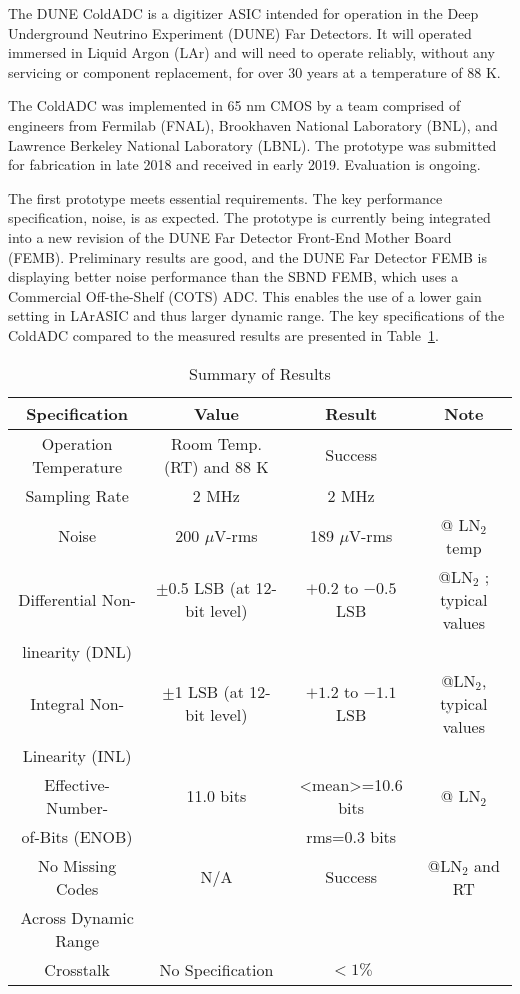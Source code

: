 \label{sec:1}

The DUNE ColdADC is a digitizer ASIC intended for operation in the Deep Underground Neutrino Experiment (DUNE) Far Detectors. It will operated immersed in Liquid Argon (LAr) and will need to operate reliably, without any servicing or component replacement, for over 30 years at a temperature of 88 K.

The ColdADC was implemented in 65 nm CMOS by a team comprised of engineers from Fermilab (FNAL), Brookhaven National Laboratory (BNL), and Lawrence Berkeley National Laboratory (LBNL). The prototype was submitted for fabrication in late 2018 and received in early 2019. Evaluation is ongoing. 

The first prototype meets essential requirements. The key performance specification, noise, is as expected. The prototype is currently being integrated into a new revision of the DUNE Far Detector Front-End Mother Board (FEMB). Preliminary results are good, and the DUNE Far Detector FEMB is displaying better noise performance than the SBND FEMB, which uses a Commercial Off-the-Shelf (COTS) ADC. This enables the use of a lower gain setting in LArASIC and thus larger dynamic range. The key specifications of the ColdADC compared to the measured results are presented in Table~\ref{tab:coldadc_specs}.
\begin{table}[h]
\centering
\begin{tabular}{|c|c|c|c|}
\hline
\textbf{ Specification } & \textbf{Value} & \textbf{Result} & \textbf{Note}  \\ \hline \hline
Operation Temperature &  Room Temp. (RT) and 88 K & Success & \\ \hline
Sampling Rate & 2 MHz & 2 MHz & \\ \hline
Noise & 200 $\mu$V-rms & 189 $\mu$V-rms & @ LN$_2$ temp \\ \hline
Differential Non- & $\pm$0.5 LSB (at 12-bit level) & $+0.2$ to $-0.5$ LSB & @LN$_2$ ; typical values \\
linearity (DNL) & & &  \\ \hline
Integral Non- & $\pm$1 LSB (at 12-bit level) & $+1.2$ to $-1.1$ LSB & @LN$_2$, typical values \\
Linearity (INL) & & &  \\ \hline
Effective-Number- & 11.0 bits & <mean>=10.6 bits & @ LN$_2$ \\ 
of-Bits (ENOB) & & rms=0.3 bits & \\ \hline
No Missing Codes & N/A & Success & @LN$_2$ and RT \\ 
Across Dynamic Range & & & \\ \hline
Crosstalk  & No Specification & $<1\%$ & \\ \hline
\end{tabular}
\caption{Summary of Results}
\label{tab:coldadc_specs}
\end{table}  

